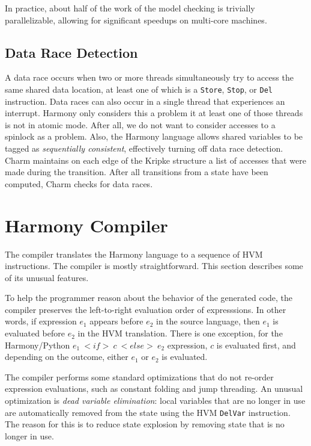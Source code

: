 \documentclass[twocolumn]{article}
\begin{document}
In practice, about half of the work of the model checking is trivially
parallelizable, allowing for significant speedups on multi-core machines.

\subsection{Data Race Detection}

A data race occurs when two or more threads simultaneously try to
access the same shared data location, at least one of which is a
\texttt{Store}, \texttt{Stop}, or \texttt{Del} instruction.  Data races
can also occur in a single thread that experiences an interrupt.  Harmony
only considers this a problem it at least one of those threads is
not in atomic mode.  After all, we do not want to consider accesses
to a spinlock as a problem.  Also, the Harmony language allows
shared variables to be tagged as \emph{sequentially consistent},
effectively turning off data race detection.  Charm maintains on
each edge of the Kripke structure a list of accesses that were made
during the transition.  After all transitions from a state have been
computed, Charm checks for data races.

\section{Harmony Compiler}

The compiler translates the Harmony language to a sequence of HVM
instructions.  The compiler is mostly straightforward.  This section
describes some of its unusual features.

To help the programmer reason about the behavior of the generated code,
the compiler preserves the left-to-right evaluation order of
expresssions.  In other words, if expression $e_1$ appears before
$e_2$ in the source language, then $e_1$ is evaluated before $e_2$
in the HVM translation.  There is one exception, for the Harmony/Python
$e_1~<{if}>~c~<{else}>~e_2$ expression, $c$ is evaluated first, and
depending on the outcome, either $e_1$ or $e_2$ is evaluated.

The compiler performs some standard optimizations that do not re-order
expression evaluations, such as constant folding and jump threading.
An unusual optimization is \emph{dead variable elimination}:
local variables that are no longer in use are automatically removed
from the state using the HVM \texttt{DelVar} instruction.  The reason
for this is to reduce state explosion by removing state that is no
longer in use.
\end{document}
